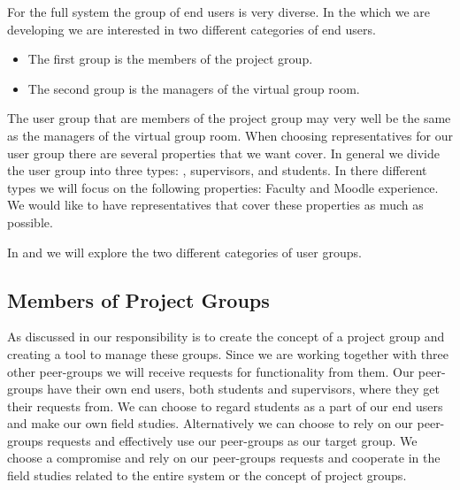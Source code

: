 For the full system the group of end users is very diverse.
In the \subsystem{} which we are developing we are interested in two different categories of end users.
\begin{itemize}
	\item The first group is the members of the project group.
	\item The second group is the managers of the virtual group room.
\end{itemize}
The user group that are members of the project group may very well be the same as the managers of the virtual group room. 
When choosing representatives for our user group there are several properties that we want cover.
In general we divide the user group into three types: , supervisors, and students. 
In there different types we will focus on the following properties: Faculty and Moodle experience.
We would like to have representatives that cover these properties as much as possible.

In  and  we will explore the two different categories of user groups.













\subsection{Members of Project Groups}
\label{sub:endusersmembers}
As discussed in  our responsibility is to create the concept of a project group and creating a tool to manage these groups.
Since we are working together with three other peer-groups we will receive requests for functionality from them.
Our peer-groups have their own end users, both students and supervisors, where they get their requests from.
We can choose to regard students as a part of our end users and make our own field studies.
Alternatively we can choose to rely on our peer-groups requests and effectively use our peer-groups as our target group.
We choose a compromise and rely on our peer-groups requests and cooperate in the field studies related to the entire system or the concept of project groups.

